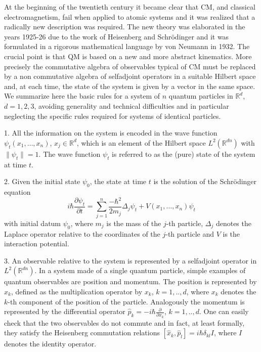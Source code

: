 \documentclass[12pt,reqno]{amsart}
\newcommand{\erre}{\mathbb{R}}
\newcommand{\n}{\relax}
\newcommand{\vs}{\vspace{0.5cm}}
\newcommand{\f}{\frac}
\newcommand{\be}{\begin{equation}}
\newcommand{\ee}{\end{equation}}
\numberwithin{equation}{section}
\begin{document}
\n
At the beginning of the twentieth century it became clear that CM, and classical electromagnetism, fail when applied to atomic systems and it was realized that a radically new description was required. The new theory was elaborated in the years 1925-26 due to the work of Heisenberg and Schr\"{o}dinger and  it was formulated in a rigorous mathematical language by von Neumann in 1932. 
The crucial point is that QM is based on a new and more abstract kinematics. 
More precisely the commutative algebra of observables typical of CM must be replaced by a non commutative algebra of selfadjoint operators in a suitable Hilbert space and, at each time,   
the state of the system is given by  a vector in the same space. 
We summarize here the basic rules for a system of $n$ quantum particles in $\erre^d$, $d=1,2,3$, avoiding  generality and technical difficulties  and in particular neglecting the specific rules required for systems of identical particles.

\vs

1.  All the information on the system is encoded in the wave function $\psi_t (x_1, \ldots ,x_n)$, $x_j \in \erre^d$,  which is an element of the Hilbert space $L^2(\erre^{dn})$ with $\|\psi_t\|=1$. The wave function $\psi_t$ is referred to as the (pure) state of the system at time $t$.


2. Given the initial state $\psi_0$, the state at time $t$ is the solution of the Schr\"{o}dinger equation 
\be
i \hbar \f{\partial \psi_t}{\partial t}= \sum_{j=1}^{n} \f{- \hbar^2}{2m_j} \Delta_j \psi_t + V(x_1, \ldots,x_n) \psi_t
\ee
with initial datum $\psi_0$, where $m_j$ is the mass of the $j$-th particle, $\Delta_j$ denotes the Laplace operator relative to the coordinates of the $j$-th particle and $V$ is the interaction potential.

3.  An observable relative to the system is represented by a selfadjoint operator in $L^2(\erre^{dn})$.   In a system made of a single quantum particle, simple examples of quantum observables are  position and  momentum.  The position  is represented by $\hat{x}_{k}$, defined as the multiplication operator by $x_{k}$, $k=1,..,d$, where $x_{k}$ denotes the $k$-th component of the position of the particle.  Analogously  the momentum  is represented by the differential operator $\hat{p}_{k}=-i\hbar \f{\partial}{\partial x_{k}}$, $k=1,..,d$. One can easily check that the two observables do not commute and in fact, at least  formally, they satisfy the Heisenberg commutation relations $[\hat{x}_{k}, \hat{p}_l ] = i \hbar \delta_{k l} I$, where $I$ denotes the identity operator. 
\end{document}
